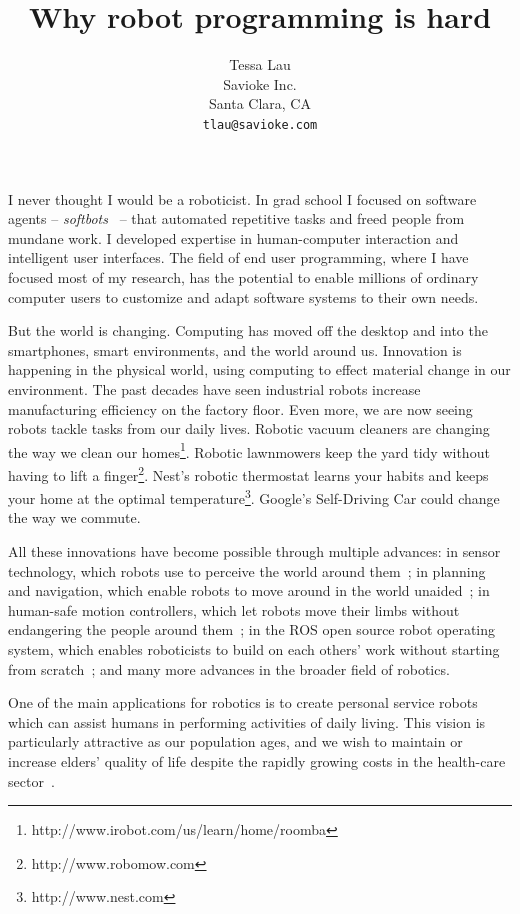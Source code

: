 \documentclass[10pt,twocolumn]{article}
\begin{document}
\title {Why robot programming is hard}
\author {Tessa Lau \\
Savioke Inc.\\
Santa Clara, CA\\
{\tt tlau@savioke.com}
}
\maketitle


I never thought I would be a roboticist. In grad school I focused on software agents -- {\em softbots}~\cite{etzioni-cacm94} -- that automated repetitive tasks and freed people from mundane work.  I developed expertise in human-computer interaction and intelligent user interfaces. The field of end user programming, where I have focused most of my research, has the potential to enable millions of ordinary computer users to customize and adapt software systems to their own needs.

But the world is changing. Computing has moved off the desktop and into the smartphones, smart environments, and the world around us. Innovation is happening in the physical world, using computing to effect material change in our environment. The past decades have seen industrial robots increase manufacturing efficiency on the factory floor. Even more, we are now seeing robots tackle tasks from our daily lives. Robotic vacuum cleaners are changing the way we clean our homes\footnote{http://www.irobot.com/us/learn/home/roomba}. Robotic lawnmowers keep the yard tidy without having to lift a finger\footnote{http://www.robomow.com}. Nest's robotic thermostat learns your habits and keeps your home at the optimal temperature\footnote{http://www.nest.com}. Google's Self-Driving Car could change the way we commute.

All these innovations have become possible through multiple advances: in sensor technology, which robots use to perceive the world around them~\cite{henry-iser10}; in planning and navigation, which enable robots to move around in the world unaided~\cite{jackel-cacm07}; in human-safe motion controllers, which let robots move their limbs without endangering the people around them~\cite{kemp-ieee07}; in the ROS open source robot operating system, which enables roboticists to build on each others' work without starting from scratch~\cite{quigley-icra09}; and many more advances in the broader field of robotics.

One of the main applications for robotics is to create personal service robots which can assist humans in performing activities of daily living. This vision is particularly attractive as our population ages, and we wish to maintain or increase elders' quality of life despite the rapidly growing costs in the health-care sector~\cite{roy-wire00}.
\end{document}
